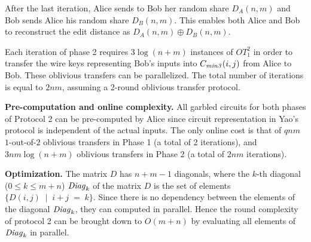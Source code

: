 After the last iteration, Alice sends to Bob her random share $D_A(n,m)$
and Bob sends Alice his random share $D_B(n,m)$.  This enables both
Alice and Bob to reconstruct the edit distance as $D_A(n,m) \oplus D_B(n,m)$.

Each iteration of phase 2 requires $3 \log(n+m)$ instances of $OT_1^2$ in
order to transfer the wire keys representing Bob's inputs into $C_{\mathit{min3}}(i,j)$
from Alice to Bob.  These oblivious transfers
can be parallelized.  The total number of iterations is equal
to $2nm$, assuming a 2-round oblivious transfer protocol.

\vspace{1ex}
\noindent
\textbf{Pre-computation and online complexity.}
All garbled circuits for both phases of Protocol 2 can be pre-computed
by Alice since circuit representation in Yao's protocol is independent of
the actual inputs.  The only online cost is that of $qnm$ $1$-out-of-$2$
oblivious transfers in Phase 1 (a total of 2 iterations),
and $3nm\log(n+m)$ oblivious transfers in Phase 2 (a total of $2nm$
iterations).

\vspace{1ex}
\noindent
\textbf{Optimization.} The matrix $D$ has $n+m-1$ diagonals, where 
the $k$-th diagonal ($0 \leq k \leq m+n$) ${\it Diag}_k$ of the matrix $D$ is 
the set of elements $\{ D(i,j) \; \mid \; i+j \; = \; k \}$. Since there
is no dependency between the elements of the diagonal ${\it Diag}_k$, they can 
computed in parallel. Hence the round complexity of protocol 2 can be brought
down to  $O(m+n)$ by evaluating all elements of ${\it Diag}_k$ in parallel.




